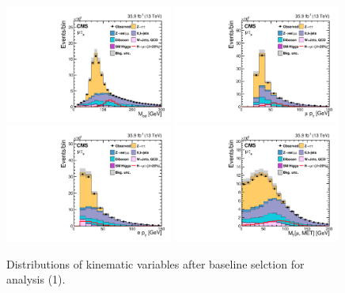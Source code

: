 \begin{figure}[!htpb]\centering
 \includegraphics[width=0.49\textwidth]{plots_and_figures/chapter5/preselection/Figure_002-a.pdf}
 \includegraphics[width=0.49\textwidth]{plots_and_figures/chapter5/preselection/Figure_002-b.pdf} \\
 \includegraphics[width=0.49\textwidth]{plots_and_figures/chapter5/preselection/Figure_002-c.pdf}
 \includegraphics[width=0.49\textwidth]{plots_and_figures/chapter5/preselection/Figure_002-d.pdf} 
\caption{Distributions of kinematic variables after baseline selction for \hmue analysis (1).}
 \label{fig:h125_presel1}
\end{figure}
